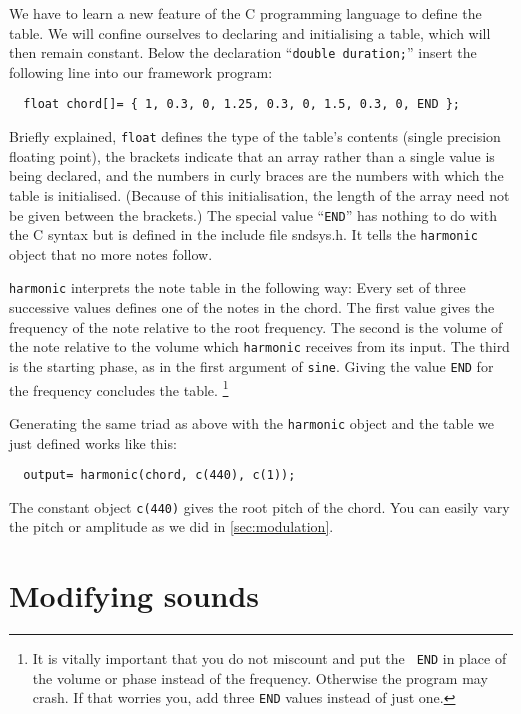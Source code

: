 \documentclass{article}
\def\bv{\begin{verbatim}}
\begin{document}
We have to learn a new feature of the C programming language to define the
table.  We will confine ourselves to declaring and initialising a table, which
will then remain constant.  Below the declaration ``{\tt double duration;}''
insert the following line into our framework program:

\bv
  float chord[]= { 1, 0.3, 0, 1.25, 0.3, 0, 1.5, 0.3, 0, END };
\end{verbatim}

Briefly explained, {\tt float} defines the type of the table's contents (single
precision floating point), the brackets indicate that an array rather than a
single value is being declared, and the numbers in curly braces are the numbers
with which the table is initialised.  (Because of this initialisation, the
length of the array need not be given between the brackets.)  The special value
``{\tt END}'' has nothing to do with the C syntax but is defined in the include
file sndsys.h.  It tells the {\tt harmonic} object that no more notes follow.

{\tt harmonic} interprets the note table in the following way: Every set of
three successive values defines one of the notes in the chord.  The first value
gives the frequency of the note relative to the root frequency.  The second
is the volume of the note relative to the volume which {\tt harmonic} receives
from its input.  The third is the starting phase, as in the first argument of
{\tt sine}.  Giving the value {\tt END} for the frequency concludes the table.%
%
\footnote{It is vitally important that you do not miscount and put the {\tt
END} in place of the volume or phase instead of the frequency.  Otherwise the
program may crash.  If that worries you, add three {\tt END} values instead of
just one.}

Generating the same triad as above with the {\tt harmonic} object and the table
we just defined works like this:

\bv
  output= harmonic(chord, c(440), c(1));
\end{verbatim}

The constant object {\tt c(440)} gives the root pitch of the chord.  You can
easily vary the pitch or amplitude as we did in \autoref{sec:modulation}.



\section{Modifying sounds}
\label{sec:modify}
\end{document}
